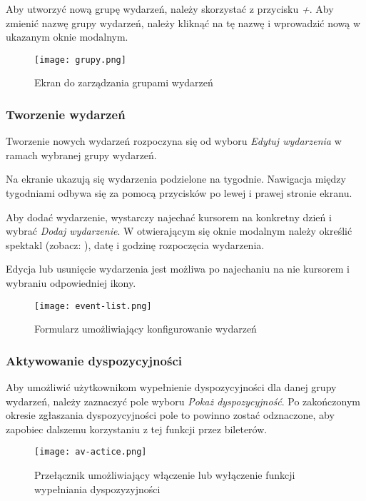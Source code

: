 \documentclass[shortabstract]{iithesis}
\begin{document}
Aby utworzyć nową grupę wydarzeń, należy skorzystać z przycisku \textit{+}. Aby zmienić nazwę grupy wydarzeń, należy kliknąć na tę nazwę i wprowadzić nową w ukazanym oknie modalnym.

\begin{figure}
    \centering
    \texttt{[image: grupy.png]}
    \caption{Ekran do zarządzania grupami wydarzeń}
    \label{fig:grupy}
\end{figure}

\subsubsection{Tworzenie wydarzeń}

Tworzenie nowych wydarzeń rozpoczyna się od wyboru \textit{Edytuj wydarzenia} w ramach wybranej grupy wydarzeń.

Na ekranie ukazują się wydarzenia podzielone na tygodnie. Nawigacja między tygodniami odbywa się za pomocą przycisków po lewej i prawej stronie ekranu.

Aby dodać wydarzenie, wystarczy najechać kursorem na konkretny dzień i wybrać \textit{Dodaj wydarzenie}. W otwierającym się oknie modalnym należy określić spektakl (zobacz: ), datę i godzinę rozpoczęcia wydarzenia.

Edycja lub usunięcie wydarzenia jest możliwa po najechaniu na nie kursorem i wybraniu odpowiedniej ikony.

\begin{figure}[H]
    \centering
    \texttt{[image: event-list.png]}
    \caption{Formularz umożliwiający konfigurowanie wydarzeń}
    \label{fig:event-list}
\end{figure}

\subsubsection{Aktywowanie dyspozycyjności}

Aby umożliwić użytkownikom wypełnienie dyspozycyjności dla danej grupy wydarzeń, należy zaznaczyć pole wyboru \textit{Pokaż dyspozycyjność}. Po zakończonym okresie zgłaszania dyspozycyjności pole to powinno zostać odznaczone, aby zapobiec dalszemu korzystaniu z tej funkcji przez bileterów.

\begin{figure}[H]
    \centering
    \texttt{[image: av-actice.png]}
    \caption{Przełącznik umożliwiający włączenie lub wyłączenie funkcji wypełniania dyspozyzyjności}
    \label{fig:av-active}
\end{figure}
\end{document}

